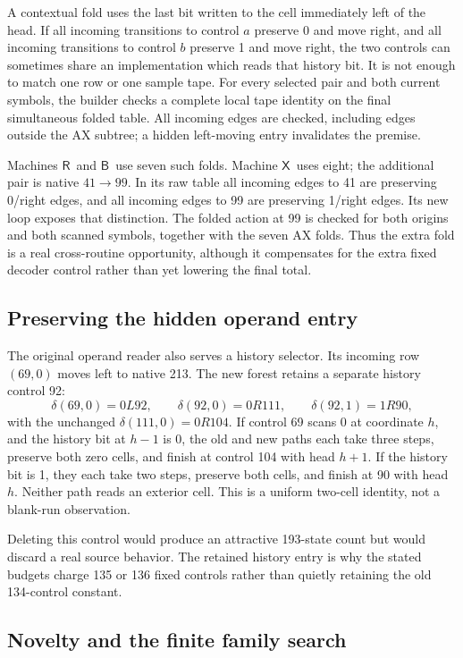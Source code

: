 \documentclass[11pt]{article}
\newcommand{\R}{\ensuremath{\mathsf R}}
\newcommand{\B}{\ensuremath{\mathsf B}}
\newcommand{\X}{\ensuremath{\mathsf X}}
\begin{document}
A contextual fold uses the last bit written to the cell immediately
left of the head. If all incoming transitions to control $a$ preserve
0 and move right, and all incoming transitions to control $b$ preserve
1 and move right, the two controls can sometimes share an implementation
which reads that history bit. It is not enough to match one row or one
sample tape. For every selected pair and both current symbols, the
builder checks a complete local tape identity on the final simultaneous
folded table. All incoming edges are checked, including edges outside
the AX subtree; a hidden left-moving entry invalidates the premise.

Machines \R\ and \B\ use seven such folds. Machine \X\ uses eight;
the additional pair is native $41\to99$. In its raw table all incoming
edges to 41 are preserving 0/right edges, and all incoming edges to 99
are preserving 1/right edges. Its new loop exposes that distinction.
The folded action at 99 is checked for both origins and both scanned
symbols, together with the seven AX folds. Thus the extra fold is a
real cross-routine opportunity, although it compensates for the extra
fixed decoder control rather than yet lowering the final total.

\subsection{Preserving the hidden operand entry}

The original operand reader also serves a history selector. Its
incoming row $(69,0)$ moves left to native 213. The new forest retains
a separate history control 92:
\[
 \delta(69,0)=0L92,\qquad
 \delta(92,0)=0R111,\qquad
 \delta(92,1)=1R90,
\]
with the unchanged $\delta(111,0)=0R104$. If control 69 scans 0 at
coordinate $h$, and the history bit at $h-1$ is 0, the old and new
paths each take three steps, preserve both zero cells, and finish at
control 104 with head $h+1$. If the history bit is 1, they each take
two steps, preserve both cells, and finish at 90 with head $h$.
Neither path reads an exterior cell. This is a uniform two-cell
identity, not a blank-run observation.

Deleting this control would produce an attractive 193-state count but
would discard a real source behavior. The retained history entry is
why the stated budgets charge 135 or 136 fixed controls rather than
quietly retaining the old 134-control constant.

\subsection{Novelty and the finite family search}
\end{document}
